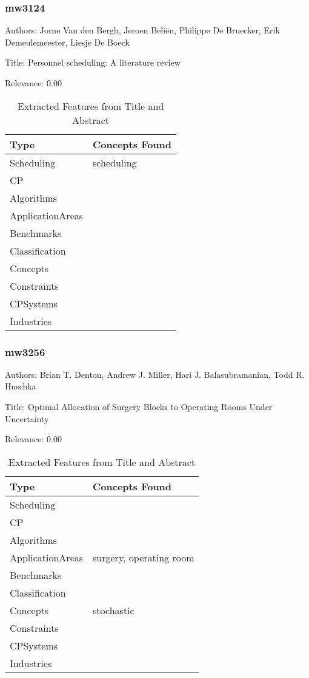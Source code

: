 \subsubsection{mw3124}
\label{mw:mw3124}

Authors: Jorne Van den Bergh, Jeroen Beliën, Philippe De Bruecker, Erik Demeulemeester, Liesje De Boeck

Title: Personnel scheduling: A literature review

Relevance:  0.00

{\scriptsize
\begin{longtable}{p{2cm}p{20cm}}
\caption{Extracted Features from Title and Abstract}\\ \toprule
Type & Concepts Found\\ \midrule
\endhead
\bottomrule
\endfoot
Scheduling & scheduling\\ 
CP & \\ 
Algorithms & \\ 
ApplicationAreas & \\ 
Benchmarks & \\ 
Classification & \\ 
Concepts & \\ 
Constraints & \\ 
CPSystems & \\ 
Industries & \\ 
\end{longtable}
}



\subsubsection{mw3256}
\label{mw:mw3256}

Authors: Brian T. Denton, Andrew J. Miller, Hari J. Balasubramanian, Todd R. Huschka

Title: Optimal Allocation of Surgery Blocks to Operating Rooms Under Uncertainty

Relevance:  0.00

{\scriptsize
\begin{longtable}{p{2cm}p{20cm}}
\caption{Extracted Features from Title and Abstract}\\ \toprule
Type & Concepts Found\\ \midrule
\endhead
\bottomrule
\endfoot
Scheduling & \\ 
CP & \\ 
Algorithms & \\ 
ApplicationAreas & surgery, operating room\\ 
Benchmarks & \\ 
Classification & \\ 
Concepts & stochastic\\ 
Constraints & \\ 
CPSystems & \\ 
Industries & \\ 
\end{longtable}
}

